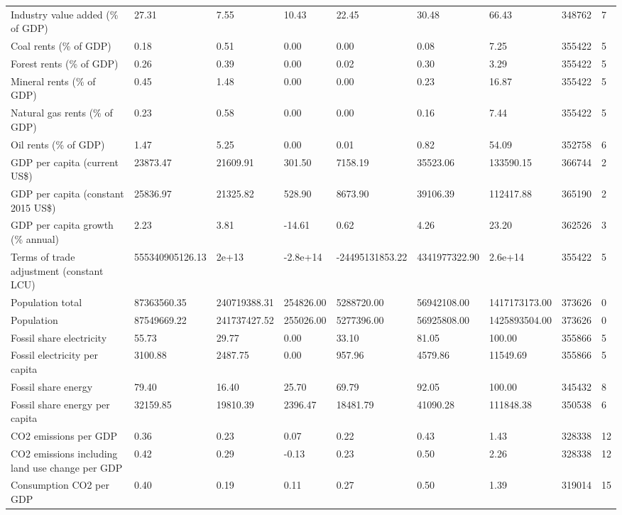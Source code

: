 \begin{longtable}{lllllllll}
Industry value added (\% of GDP) & 27.31 & 7.55 & 10.43 & 22.45 & 30.48 & 66.43 & 348762 & 7\\
Coal rents (\% of GDP) & 0.18 & 0.51 & 0.00 & 0.00 & 0.08 & 7.25 & 355422 & 5\\
Forest rents (\% of GDP) & 0.26 & 0.39 & 0.00 & 0.02 & 0.30 & 3.29 & 355422 & 5\\
Mineral rents (\% of GDP) & 0.45 & 1.48 & 0.00 & 0.00 & 0.23 & 16.87 & 355422 & 5\\
\addlinespace
Natural gas rents (\% of GDP) & 0.23 & 0.58 & 0.00 & 0.00 & 0.16 & 7.44 & 355422 & 5\\
Oil rents (\% of GDP) & 1.47 & 5.25 & 0.00 & 0.01 & 0.82 & 54.09 & 352758 & 6\\
GDP per capita (current US\$) & 23873.47 & 21609.91 & 301.50 & 7158.19 & 35523.06 & 133590.15 & 366744 & 2\\
GDP per capita (constant 2015 US\$) & 25836.97 & 21325.82 & 528.90 & 8673.90 & 39106.39 & 112417.88 & 365190 & 2\\
GDP per capita growth (\% annual) & 2.23 & 3.81 & -14.61 & 0.62 & 4.26 & 23.20 & 362526 & 3\\
\addlinespace
Terms of trade adjustment (constant LCU) & 555340905126.13 & 2e+13 & -2.8e+14 & -24495131853.22 & 4341977322.90 & 2.6e+14 & 355422 & 5\\
Population total & 87363560.35 & 240719388.31 & 254826.00 & 5288720.00 & 56942108.00 & 1417173173.00 & 373626 & 0\\
Population & 87549669.22 & 241737427.52 & 255026.00 & 5277396.00 & 56925808.00 & 1425893504.00 & 373626 & 0\\
Fossil share electricity & 55.73 & 29.77 & 0.00 & 33.10 & 81.05 & 100.00 & 355866 & 5\\
Fossil electricity per capita & 3100.88 & 2487.75 & 0.00 & 957.96 & 4579.86 & 11549.69 & 355866 & 5\\
\addlinespace
Fossil share energy & 79.40 & 16.40 & 25.70 & 69.79 & 92.05 & 100.00 & 345432 & 8\\
Fossil share energy per capita & 32159.85 & 19810.39 & 2396.47 & 18481.79 & 41090.28 & 111848.38 & 350538 & 6\\
CO2 emissions per GDP & 0.36 & 0.23 & 0.07 & 0.22 & 0.43 & 1.43 & 328338 & 12\\
CO2 emissions including land use change per GDP & 0.42 & 0.29 & -0.13 & 0.23 & 0.50 & 2.26 & 328338 & 12\\
Consumption CO2 per GDP & 0.40 & 0.19 & 0.11 & 0.27 & 0.50 & 1.39 & 319014 & 15\\

\end{longtable}

